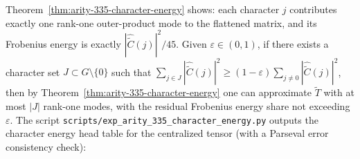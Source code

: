 \begin{remark}[Auditable diagnostic: head share of character energy \texorpdfstring{$\Rightarrow$}{=>} low-rank compressibility]\label{rem:arity-335-character-energy-diagnostic}
Theorem~\ref{thm:arity-335-character-energy} shows: each character \(j\) contributes exactly one rank-one outer-product mode to the flattened matrix, and its Frobenius energy is exactly \(|\widehat{\widetilde C}(j)|^2/45\).
Given \(\varepsilon\in(0,1)\), if there exists a character set \(J\subset G\setminus\{0\}\) such that \(\sum_{j\in J}|\widehat{\widetilde C}(j)|^2\ge (1-\varepsilon)\sum_{j\ne 0}|\widehat{\widetilde C}(j)|^2\), then by Theorem~\ref{thm:arity-335-character-energy} one can approximate \(\widetilde T\) with at most \(|J|\) rank-one modes, with the residual Frobenius energy share not exceeding \(\varepsilon\).
The script \texttt{scripts/exp\_arity\_335\_character\_energy.py} outputs the character energy head table for the centralized tensor (with a Parseval error consistency check):

\end{remark}

